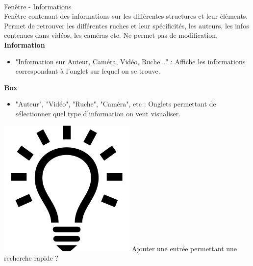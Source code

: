 \documentclass[11pt,french,a4paper]{report}
\begin{document}
\dotfill \\
\Large Fenêtre - Informations \\ \normalsize 
    Fenêtre contenant des informations sur les différentes structures et leur éléments. Permet de retrouver les différentes ruches
    et leur spécificités, les auteurs, les infos contenues dans vidéos, les caméras etc. Ne permet pas de modification. \\
\large \textbf{Information} \normalsize
    \begin{itemize}[label=, leftmargin=*,parsep=0cm,itemsep=0cm,topsep=0cm]
        \item "Information sur Auteur, Caméra, Vidéo, Ruche..." : Affiche les informations correspondant à l'onglet sur lequel on se trouve.
    \end{itemize}
\large \textbf{Box} \normalsize
    \begin{itemize}[label=, leftmargin=*,parsep=0cm,itemsep=0cm,topsep=0cm]
        \item "Auteur", "Vidéo", "Ruche", "Caméra", etc : Onglets permettant de sélectionner quel type d'information on veut visualiser.
    \end{itemize}
    \includegraphics[scale=0.05]{../images/logo/logo_ampoule} Ajouter une entrée permettant une recherche rapide ? \\

\dotfill \\
\end{document}
